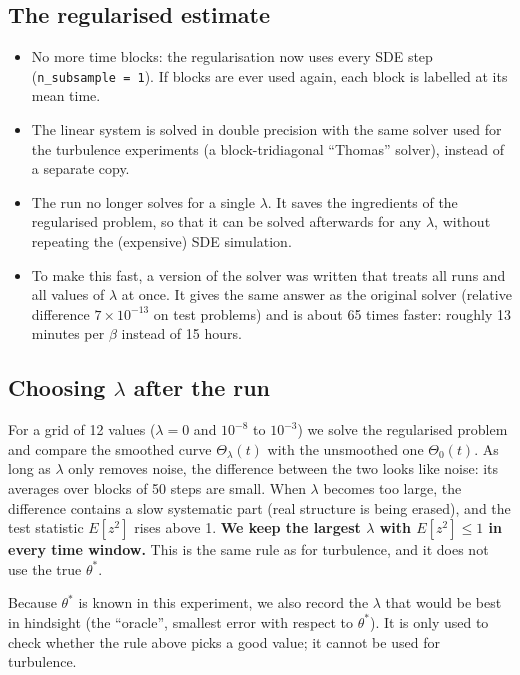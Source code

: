 \documentclass[11pt,a4paper]{article}
\newcommand{\code}[1]{\texttt{#1}}
\begin{document}
\subsection*{The regularised estimate}
\begin{itemize}
  \item No more time blocks: the regularisation now uses every SDE step (\code{n\_subsample = 1}).
        If blocks are ever used again, each block is labelled at its mean time.
  \item The linear system is solved in double precision with the same solver used for the
        turbulence experiments (a block-tridiagonal ``Thomas'' solver), instead of a separate copy.
  \item The run no longer solves for a single $\lambda$. It saves the ingredients of the
        regularised problem, so that it can be solved afterwards for any $\lambda$, without
        repeating the (expensive) SDE simulation.
  \item To make this fast, a version of the solver was written that treats all runs and all
        values of $\lambda$ at once. It gives the same answer as the original solver (relative
        difference $7\times10^{-13}$ on test problems) and is about 65 times faster: roughly
        13 minutes per $\beta$ instead of 15 hours.
\end{itemize}

\subsection*{Choosing $\lambda$ after the run}
For a grid of 12 values ($\lambda = 0$ and $10^{-8}$ to $10^{-3}$) we solve the regularised
problem and compare the smoothed curve $\Theta_\lambda(t)$ with the unsmoothed one
$\Theta_0(t)$. As long as $\lambda$ only removes noise, the difference between the two looks
like noise: its averages over blocks of 50 steps are small. When $\lambda$ becomes too large,
the difference contains a slow systematic part (real structure is being erased), and the test
statistic $E[z^2]$ rises above 1. \textbf{We keep the largest $\lambda$ with $E[z^2] \le 1$ in
every time window.} This is the same rule as for turbulence, and it does not use the true
$\theta^*$.

Because $\theta^*$ is known in this experiment, we also record the $\lambda$ that would be best
in hindsight (the ``oracle'', smallest error with respect to $\theta^*$). It is only used
to check whether the rule above picks a good value; it cannot be used for turbulence.
\end{document}
